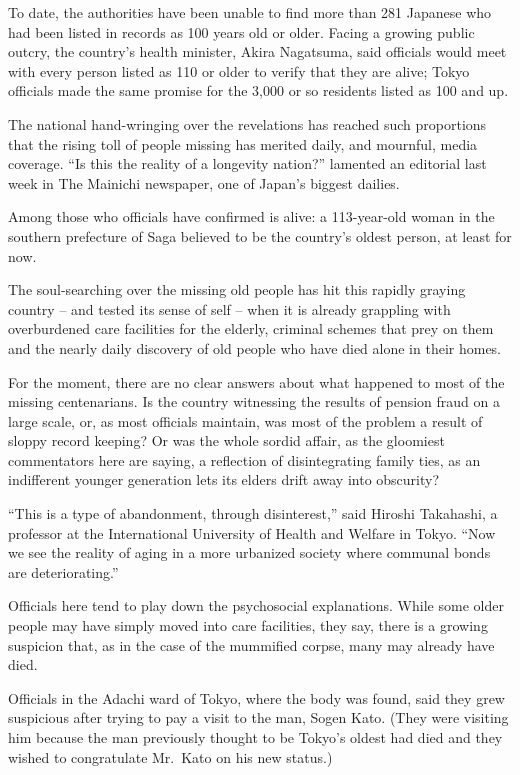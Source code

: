 ﻿\documentclass[12pt]{article}
\begin{document}
To date, the authorities have been unable to find more than 281 Japanese who had been listed in
records as 100 years old or older. Facing a growing public outcry, the country's health minister,
Akira Nagatsuma, said officials would meet with every person listed as 110 or older to verify that
they are alive; Tokyo officials made the same promise for the 3,000 or so residents listed as 100
and up.

The national hand-wringing over the revelations has reached such proportions that the rising toll of
people missing has merited daily, and mournful, media coverage. ``Is this the reality of a longevity
nation?'' lamented an editorial last week in The Mainichi newspaper, one of Japan's biggest dailies.

Among those who officials have confirmed is alive: a 113-year-old woman in the southern prefecture
of Saga believed to be the country's oldest person, at least for now.

The soul-searching over the missing old people has hit this rapidly graying country -- and tested
its sense of self -- when it is already grappling with overburdened care facilities for the elderly,
criminal schemes that prey on them and the nearly daily discovery of old people who have died alone
in their homes.

For the moment, there are no clear answers about what happened to most of the missing centenarians.
Is the country witnessing the results of pension fraud on a large scale, or, as most officials
maintain, was most of the problem a result of sloppy record keeping? Or was the whole sordid affair,
as the gloomiest commentators here are saying, a reflection of disintegrating family ties, as an
indifferent younger generation lets its elders drift away into obscurity?

``This is a type of abandonment, through disinterest,'' said Hiroshi Takahashi, a professor at the
International University of Health and Welfare in Tokyo. ``Now we see the reality of aging in a more
urbanized society where communal bonds are deteriorating.''

Officials here tend to play down the psychosocial explanations. While some older people may have
simply moved into care facilities, they say, there is a growing suspicion that, as in the case of
the mummified corpse, many may already have died.

Officials in the Adachi ward of Tokyo, where the body was found, said they grew suspicious after
trying to pay a visit to the man, Sogen Kato. (They were visiting him because the man previously
thought to be Tokyo's oldest had died and they wished to congratulate Mr.~Kato on his new status.)
\end{document}
